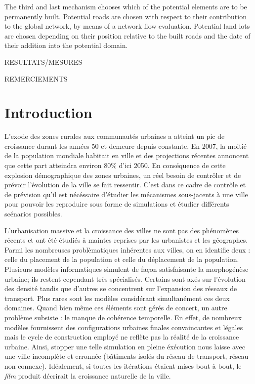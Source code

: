\documentclass[12pt]{article}
\begin{document}
The third and last mechanism chooses which of the potential elements
are to be permanently built. Potential roads are chosen with respect
to their contribution to the global network, by means of a network
flow evaluation. Potential land lots are chosen depending on their
position relative to the built roads and the date of their addition
into the potential domain.

RESULTATS/MESURES

\newpage

\tableofcontents

\newpage

REMERCIEMENTS

\newpage

\section{Introduction}

L'exode des zones rurales aux communautés urbaines a atteint un pic de
croissance durant les années 50 et demeure depuis constante. En 2007,
la moitié de la population mondiale habitait en ville et des
projections récentes annoncent que cette part atteindra environ 80\%
d'ici 2050. En conséquence de cette explosion démographique des zones
urbaines, un réel besoin de contrôler et de prévoir l'évolution de la
ville se fait ressentir. C'est dans ce cadre de contrôle et de
prévision qu'il est nécéssaire d'étudier les mécanismes sous-jacents à
une ville pour pouvoir les reproduire sous forme de simulations et
étudier différents scénarios possibles.

L'urbanisation massive et la croissance des villes ne sont pas des
phénomènes récents et ont été étudiés à maintes reprises par les
urbanistes et les géographes. Parmi les nombreuses problèmatiques
inhérentes aux villes, on en identifie deux : celle du placement de la
population et celle du déplacement de la population. Plusieurs modèles
informatiques simulent de façon satisfaisante la morphogénèse urbaine;
ils restent cependant très spécialisés. Certains sont axés sur
l'évolution des densité tandis que d'autres se concentrent sur
l'expansion des réseaux de transport. Plus rares sont les modèles
considérant simultanément ces deux domaines. Quand bien même ces
éléments sont gérés de concert, un autre problème subsiste : le manque
de cohérence temporelle. En effet, de nombreux modèles fournissent des
configurations urbaines finales convaincantes et légales mais le cycle
de construction employé ne reflète pas la réalité de la croissance
urbaine. Ainsi, stopper une telle simulation en pleine éxécution nous
laisse avec une ville incomplète et erronnée (bâtiments isolés du
réseau de transport, réseau non connexe). Idéalement, si toutes les
itérations étaient mises bout à bout, le \textit{film} produit
décrirait la croissance naturelle de la ville.
\end{document}
